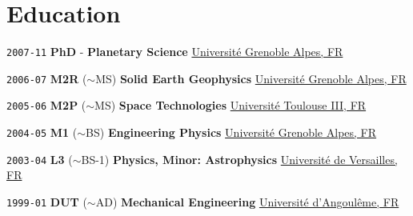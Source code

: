\section*{Education}

\TabPositions{5em,8em,13em,28em}

\noindent \texttt{2007-11}
\tab \textbf{PhD} 
\tab -
\tab \textbf{Planetary Science} 
\tab \href{https://www.univ-grenoble-alpes.fr/}{Université Grenoble Alpes, FR}

\noindent \texttt{2006-07}
\tab \textbf{M2R}
\tab ($\sim$MS)
\tab \textbf{Solid Earth Geophysics}
\tab \href{https://www.univ-grenoble-alpes.fr/}{Université Grenoble Alpes, FR}

\noindent \texttt{2005-06}
\tab \textbf{M2P}
\tab ($\sim$MS)
\tab \textbf{Space Technologies}
\tab \href{https://www.univ-tlse3.fr/}{Université Toulouse III, FR}

\noindent \texttt{2004-05}
\tab \textbf{M1}
\tab ($\sim$BS)
\tab \textbf{Engineering Physics}
\tab \href{https://www.univ-grenoble-alpes.fr/}{Université Grenoble Alpes, FR}

\noindent \texttt{2003-04}
\tab \textbf{L3}
\tab ($\sim$BS-1)
\tab \textbf{Physics, Minor: Astrophysics}
\tab \href{http://www.sciences.uvsq.fr/}{Université de Versailles, FR}

\noindent \texttt{1999-01}
\tab \textbf{DUT}
\tab ($\sim$AD)
\tab \textbf{Mechanical Engineering}
\tab \href{https://iut-angouleme.univ-poitiers.fr/}{Université d'Angoulême, FR}